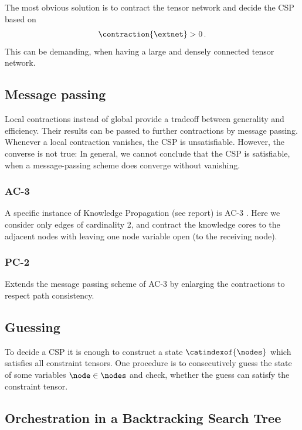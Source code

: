 \documentclass[aps,onecolumn,nofootinbib,pra]{article}
\begin{document}
    The most obvious solution is to contract the tensor network and decide the CSP based on
    \[ \contraction{\extnet} > 0 \, . \]
    This can be demanding, when having a large and densely connected tensor network.

    \subsection{Message passing}

    Local contractions instead of global provide a tradeoff between generality and efficiency.
    Their results can be passed to further contractions by message passing.
    Whenever a local contraction vanishes, the CSP is unsatisfiable.
    However, the converse is not true: In general, we cannot conclude that the CSP is satisfiable, when a message-passing scheme does converge without vanishing.

    \subsubsection{AC-3}

    A specific instance of Knowledge Propagation (see report) is AC-3 \cite{mackworth_consistency_1977}.
    Here we consider only edges of cardinality 2, and contract the knowledge cores to the adjacent nodes with leaving one node variable open (to the receiving node).

    \subsubsection{PC-2}

    Extends the message passing scheme of AC-3 by enlarging the contractions to respect path consistency.

    \subsection{Guessing}

    To decide a CSP it is enough to construct a state $\catindexof{\nodes}$ which satisfies all constraint tensors.
    One procedure is to consecutively guess the state of some variables $\node\in\nodes$ and check, whether the guess can satisfy the constraint tensor.

    \subsection{Orchestration in a Backtracking Search Tree}
\end{document}
